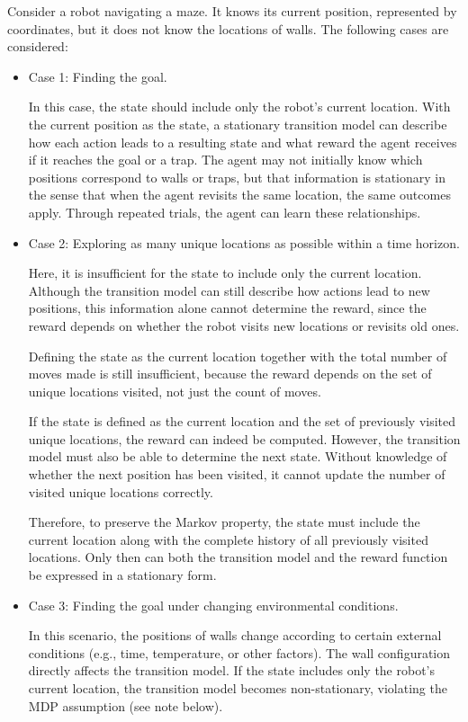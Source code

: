 \begin{mdframed}
	Consider a robot navigating a maze. It knows its current position, represented by coordinates, but it does not know the locations of walls. The following cases are considered:
	
	\begin{itemize}
		\item Case 1: Finding the goal.
		
		In this case, the state should include only the robot’s current location. With the current position as the state, a stationary transition model can describe how each action leads to a resulting state and what reward the agent receives if it reaches the goal or a trap. The agent may not initially know which positions correspond to walls or traps, but that information is stationary in the sense that when the agent revisits the same location, the same outcomes apply. Through repeated trials, the agent can learn these relationships.
		
		\item Case 2: Exploring as many unique locations as possible within a time horizon.
		
		Here, it is insufficient for the state to include only the current location. Although the transition model can still describe how actions lead to new positions, this information alone cannot determine the reward, since the reward depends on whether the robot visits new locations or revisits old ones.
		
		Defining the state as the current location together with the total number of moves made is still insufficient, because the reward depends on the set of unique locations visited, not just the count of moves.
		
		If the state is defined as the current location and the set of previously visited unique locations, the reward can indeed be computed. However, the transition model must also be able to determine the next state. Without knowledge of whether the next position has been visited, it cannot update the number of visited unique locations correctly.
		
		Therefore, to preserve the Markov property, the state must include the current location along with the complete history of all previously visited locations. Only then can both the transition model and the reward function be expressed in a stationary form.
		
		\item Case 3: Finding the goal under changing environmental conditions.
		
		In this scenario, the positions of walls change according to certain external conditions (e.g., time, temperature, or other factors). The wall configuration directly affects the transition model. If the state includes only the robot’s current location, the transition model becomes non-stationary, violating the MDP assumption (see note below). 
		

\end{itemize}
\end{mdframed}
